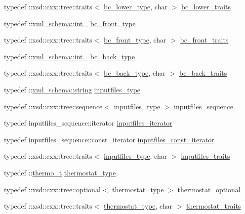 \begin{DoxyCompactItemize}
typedef \+::xsd\+::cxx\+::tree\+::traits$<$ \hyperlink{classsetting__t_a69864ad49075236ce00f2a73cdcbb13b}{bc\+\_\+lower\+\_\+type}, char $>$ \hyperlink{classsetting__t_a59114f8a8f73c5064628778c0e1cb9d5}{bc\+\_\+lower\+\_\+traits}
\item 
typedef \+::\hyperlink{namespacexml__schema_acfa24ac68e1a188e7f44c36f7a158bf4}{xml\+\_\+schema\+::int\+\_\+} \hyperlink{classsetting__t_a6010c9a9fc3ce2a4d583aa4bf07f650c}{bc\+\_\+front\+\_\+type}
\item 
typedef \+::xsd\+::cxx\+::tree\+::traits$<$ \hyperlink{classsetting__t_a6010c9a9fc3ce2a4d583aa4bf07f650c}{bc\+\_\+front\+\_\+type}, char $>$ \hyperlink{classsetting__t_a371a2bd08322094079d3ff5fbebf6add}{bc\+\_\+front\+\_\+traits}
\item 
typedef \+::\hyperlink{namespacexml__schema_acfa24ac68e1a188e7f44c36f7a158bf4}{xml\+\_\+schema\+::int\+\_\+} \hyperlink{classsetting__t_a5deb32969da7832b53abbf0564142627}{bc\+\_\+back\+\_\+type}
\item 
typedef \+::xsd\+::cxx\+::tree\+::traits$<$ \hyperlink{classsetting__t_a5deb32969da7832b53abbf0564142627}{bc\+\_\+back\+\_\+type}, char $>$ \hyperlink{classsetting__t_a5edb994d60080ec2324d0bfaec5d017f}{bc\+\_\+back\+\_\+traits}
\item 
typedef \+::\hyperlink{namespacexml__schema_ac0cec83a330f0024e4e318b3deac5104}{xml\+\_\+schema\+::string} \hyperlink{classsetting__t_a9775dbebbc97cf7465126aa14870147d}{inputfiles\+\_\+type}
\item 
typedef \+::xsd\+::cxx\+::tree\+::sequence$<$ \hyperlink{classsetting__t_a9775dbebbc97cf7465126aa14870147d}{inputfiles\+\_\+type} $>$ \hyperlink{classsetting__t_a7f069827c89edb95e2b4347f1484b7b3}{inputfiles\+\_\+sequence}
\item 
typedef inputfiles\+\_\+sequence\+::iterator \hyperlink{classsetting__t_aba5818f4d041a7e5fd85bc8dbad26cf6}{inputfiles\+\_\+iterator}
\item 
typedef inputfiles\+\_\+sequence\+::const\+\_\+iterator \hyperlink{classsetting__t_ae3c8f20640b10bda631423b7a7992d96}{inputfiles\+\_\+const\+\_\+iterator}
\item 
typedef \+::xsd\+::cxx\+::tree\+::traits$<$ \hyperlink{classsetting__t_a9775dbebbc97cf7465126aa14870147d}{inputfiles\+\_\+type}, char $>$ \hyperlink{classsetting__t_a71049fe8358aa247607006a6bfe661b5}{inputfiles\+\_\+traits}
\item 
typedef \+::\hyperlink{classthermo__t}{thermo\+\_\+t} \hyperlink{classsetting__t_a3c147644eb31a9319ad4df3b5827777f}{thermostat\+\_\+type}
\item 
typedef \+::xsd\+::cxx\+::tree\+::optional$<$ \hyperlink{classsetting__t_a3c147644eb31a9319ad4df3b5827777f}{thermostat\+\_\+type} $>$ \hyperlink{classsetting__t_a0e8b6cd8315d18962e1e25dea062eb1d}{thermostat\+\_\+optional}
\item 
typedef \+::xsd\+::cxx\+::tree\+::traits$<$ \hyperlink{classsetting__t_a3c147644eb31a9319ad4df3b5827777f}{thermostat\+\_\+type}, char $>$ \hyperlink{classsetting__t_a06272ec2e9d434de40e09e27cc54cd13}{thermostat\+\_\+traits}
\end{DoxyCompactItemize}
